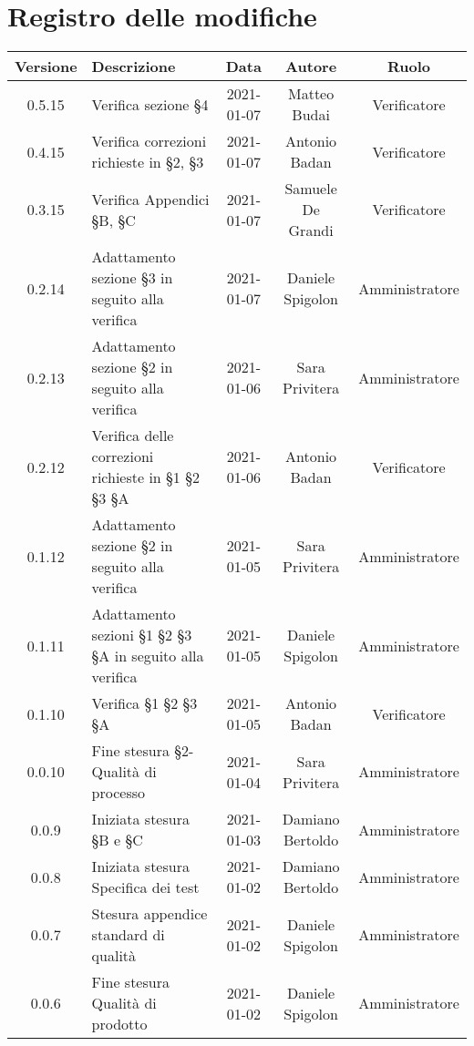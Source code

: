 \section*{Registro delle modifiche}

\begin{center}
	\begin{longtable}{|c|p{5cm}|c|c|c|}
	\hline
	\rowcolor{lighter-grayer}
	\textbf{Versione} & \textbf{Descrizione} & \textbf{Data} & \textbf{Autore} & \textbf{Ruolo} \\
	\hline
	\endfirsthead

	0.5.15 & Verifica sezione §4  & 2021-01-07 & Matteo Budai & Verificatore \\
	\hline
	0.4.15 & Verifica correzioni richieste in §2, §3  & 2021-01-07 & Antonio Badan & Verificatore \\
	\hline
	0.3.15 & Verifica Appendici §B, §C  & 2021-01-07 & Samuele De Grandi & Verificatore \\
	\hline
	0.2.14 & Adattamento sezione §3 in seguito alla verifica & 2021-01-07 & Daniele Spigolon & Amministratore \\
	\hline
	0.2.13 & Adattamento sezione §2 in seguito alla verifica & 2021-01-06 & Sara Privitera & Amministratore \\
	\hline
	0.2.12 & Verifica delle correzioni richieste in §1 §2 §3 §A & 2021-01-06 & Antonio Badan & Verificatore \\
	\hline
	0.1.12 & Adattamento sezione §2 in seguito alla verifica & 2021-01-05 & Sara Privitera & Amministratore \\
	\hline
	0.1.11 & Adattamento sezioni §1 §2 §3 §A in seguito alla verifica & 2021-01-05 & Daniele Spigolon & Amministratore \\
	\hline
	0.1.10 & Verifica §1 §2 §3 §A & 2021-01-05 & Antonio Badan & Verificatore \\
	\hline
	0.0.10 & Fine stesura §2-Qualità di processo & 2021-01-04 & Sara Privitera & Amministratore \\
	\hline
	0.0.9 & Iniziata stesura §B e §C & 2021-01-03 & Damiano Bertoldo & Amministratore \\
	\hline
	0.0.8 & Iniziata stesura Specifica dei test & 2021-01-02 & Damiano Bertoldo & Amministratore \\
	\hline
	0.0.7 & Stesura appendice standard di qualità & 2021-01-02 & Daniele Spigolon & Amministratore \\
	\hline
	0.0.6 & Fine stesura Qualità di prodotto & 2021-01-02 & Daniele Spigolon & Amministratore \\

\end{longtable}
\end{center}
